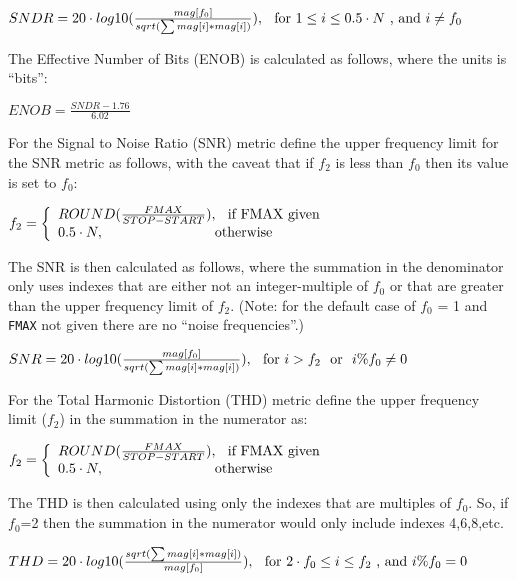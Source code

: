 $SNDR = 20 \cdot log10(\frac{mag[f_{0}]}{sqrt(\sum mag[i]*mag[i])}),\hspace*{0.1in}\textrm{for}~1 \leq i \leq 0.5 \cdot N ~\textrm{, and}~i \neq f_{0}$

The Effective Number of Bits (ENOB) is calculated as follows, where the units is ``bits'':

$ENOB = \frac{SNDR - 1.76}{6.02}$

For the Signal to Noise Ratio (SNR) metric define the upper frequency limit for the SNR metric as follows,
with the caveat that if $f_{2}$ is less than $f_{0}$ then its value is set to $f_{0}$:

$f_{2}=\left\{\begin{array}{ll}ROUND(\frac{FMAX}{STOP-START}),\hspace*{0.1in}\textrm{if FMAX given}\\
   0.5 \cdot N,\hspace*{1.1in}\textrm{otherwise}\end{array}\right.$

The SNR is then calculated as follows, where the summation in the denominator only uses indexes that
are either not an integer-multiple of $f_{0}$ or that are greater than the upper frequency limit of $f_{2}$.
(Note: for the default case of $f_{0}$ = 1 and \texttt{FMAX} not given there are no ``noise frequencies''.)

$SNR = 20 \cdot log10(\frac{mag[f_{0}]}{sqrt(\sum mag[i]*mag[i])}),\hspace*{0.1in}\textrm{for}~i > f_{2} ~\textrm{ or }~i\%f_{0} \ne 0$

For the Total Harmonic Distortion (THD) metric define the upper frequency limit ($f_{2}$) in
the summation in the numerator as:

$f_{2}=\left\{\begin{array}{ll}ROUND(\frac{FMAX}{STOP-START}),\hspace*{0.1in}\textrm{if FMAX given} \\ 0.5 \cdot N,\hspace*{1.1in}\textrm{otherwise}\end{array}\right.$

The THD is then calculated using only the indexes that are multiples of $f_{0}$.  So, if $f_{0}$=2
then the summation in the numerator would only include indexes 4,6,8,etc.

$THD = 20 \cdot log10(\frac{sqrt(\sum mag[i]*mag[i])}{mag[f_{0}]}),\hspace*{0.1in}\textrm{for}~2 \cdot f_{0} \leq i \leq f_{2} ~\textrm{, and}~i\%f_{0}=0$

